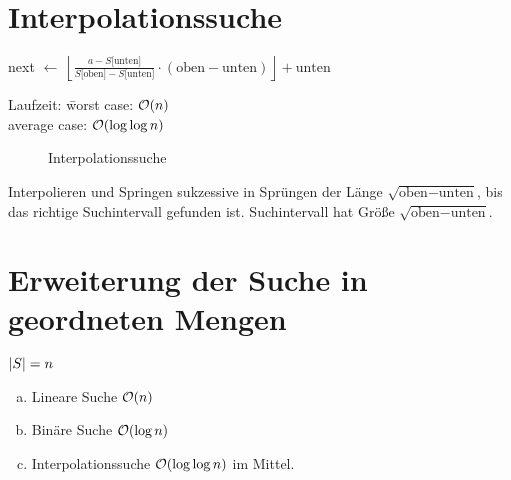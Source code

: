     \section{Interpolationssuche}

        next $\leftarrow~\left\lfloor \frac{a - S \lbrack \text{unten} \rbrack}{S \lbrack \text{oben} \rbrack - 
        S \lbrack \text{unten} \rbrack} \cdot \left( \text{oben} - \text{unten} \right)\right\rfloor + \text{unten}$\\
        \begin{tabbing}
            Laufzeit: \= worst case: $\mathcal{O}(n)$\\
            \> average case: $\mathcal{O}(\log \log n)$
        \end{tabbing}

        \begin{figure}
            \centering
            
            \caption{Interpolationssuche}
            \label{diag2:interpolationsearch}
        \end{figure}
        
        Interpolieren und Springen sukzessive in Sprüngen der Länge $\sqrt{\text{oben} - \text{unten}}$, bis das richtige Suchintervall gefunden ist.
        Suchintervall hat Größe $\sqrt{\text{oben} - \text{unten}}$.

    
    \section{Erweiterung der Suche in geordneten Mengen}
        $\left| S \right| = n$ \\
        \begin{enumerate}[a.)]
            \item Lineare Suche $\mathcal{O}(n)$ 
            \item Binäre Suche $\mathcal{O}(\log n)$
            \item Interpolationssuche $\mathcal{O}(\log \log n)$ im Mittel.
        \end{enumerate}
      

